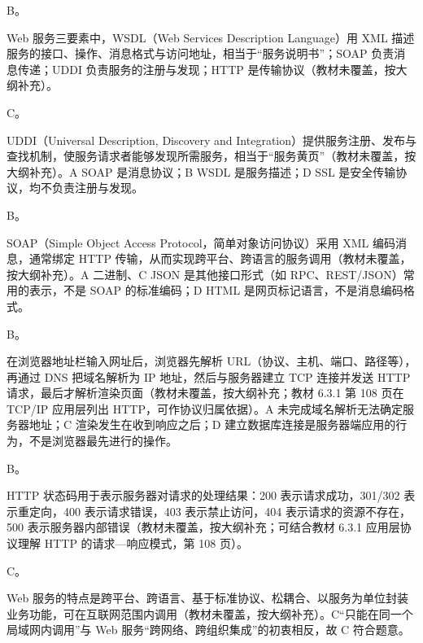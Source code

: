 \documentclass[a4paper,11pt]{article}
\begin{document}
\q B。\begin{analysis}Web 服务三要素中，WSDL（Web Services Description Language）用 XML 描述服务的接口、操作、消息格式与访问地址，相当于“服务说明书”；SOAP 负责消息传递；UDDI 负责服务的注册与发现；HTTP 是传输协议（教材未覆盖，按大纲补充）。\end{analysis}

\q C。\begin{analysis}UDDI（Universal Description, Discovery and Integration）提供服务注册、发布与查找机制，使服务请求者能够发现所需服务，相当于“服务黄页”（教材未覆盖，按大纲补充）。A SOAP 是消息协议；B WSDL 是服务描述；D SSL 是安全传输协议，均不负责注册与发现。\end{analysis}

\q B。\begin{analysis}SOAP（Simple Object Access Protocol，简单对象访问协议）采用 XML 编码消息，通常绑定 HTTP 传输，从而实现跨平台、跨语言的服务调用（教材未覆盖，按大纲补充）。A 二进制、C JSON 是其他接口形式（如 RPC、REST/JSON）常用的表示，不是 SOAP 的标准编码；D HTML 是网页标记语言，不是消息编码格式。\end{analysis}

\q B。\begin{analysis}在浏览器地址栏输入网址后，浏览器先解析 URL（协议、主机、端口、路径等），再通过 DNS 把域名解析为 IP 地址，然后与服务器建立 TCP 连接并发送 HTTP 请求，最后才解析渲染页面（教材未覆盖，按大纲补充；教材 6.3.1 第 108 页在 TCP/IP 应用层列出 HTTP，可作协议归属依据）。A 未完成域名解析无法确定服务器地址；C 渲染发生在收到响应之后；D 建立数据库连接是服务器端应用的行为，不是浏览器最先进行的操作。\end{analysis}

\q B。\begin{analysis}HTTP 状态码用于表示服务器对请求的处理结果：200 表示请求成功，301/302 表示重定向，400 表示请求错误，403 表示禁止访问，404 表示请求的资源不存在，500 表示服务器内部错误（教材未覆盖，按大纲补充；可结合教材 6.3.1 应用层协议理解 HTTP 的请求—响应模式，第 108 页）。\end{analysis}

\q C。\begin{analysis}Web 服务的特点是跨平台、跨语言、基于标准协议、松耦合、以服务为单位封装业务功能，可在互联网范围内调用（教材未覆盖，按大纲补充）。C“只能在同一个局域网内调用”与 Web 服务“跨网络、跨组织集成”的初衷相反，故 C 符合题意。\end{analysis}

\end{document}
